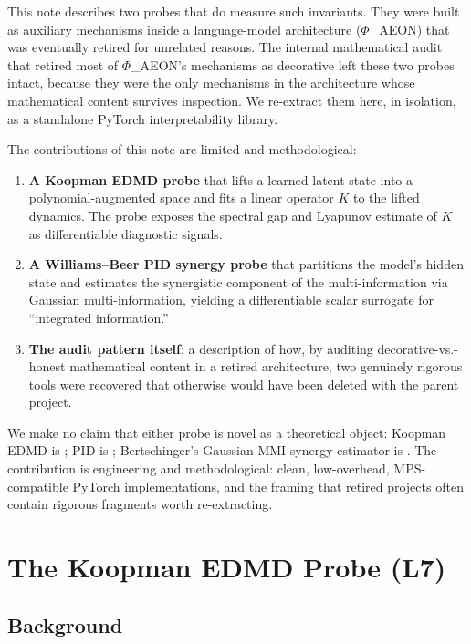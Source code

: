 \documentclass[11pt]{article}
\begin{document}
This note describes two probes that do measure such invariants. They were
built as auxiliary mechanisms inside a language-model architecture
($\Phi$\_AEON) that was eventually retired for unrelated reasons. The
internal mathematical audit that retired most of $\Phi$\_AEON's mechanisms
as decorative left these two probes intact, because they were the only
mechanisms in the architecture whose mathematical content survives
inspection. We re-extract them here, in isolation, as a standalone
PyTorch interpretability library.

The contributions of this note are limited and methodological:

\begin{enumerate}
\item \textbf{A Koopman EDMD probe} that lifts a learned latent state
into a polynomial-augmented space and fits a linear operator $K$ to the
lifted dynamics. The probe exposes the spectral gap and Lyapunov estimate
of $K$ as differentiable diagnostic signals.
\item \textbf{A Williams--Beer PID synergy probe} that partitions the
model's hidden state and estimates the synergistic component of the
multi-information via Gaussian multi-information, yielding a
differentiable scalar surrogate for ``integrated information.''
\item \textbf{The audit pattern itself}: a description of how, by
auditing decorative-vs.-honest mathematical content in a retired
architecture, two genuinely rigorous tools were recovered that otherwise
would have been deleted with the parent project.
\end{enumerate}

We make no claim that either probe is novel as a theoretical object:
Koopman EDMD is \citet{williams2015data}; PID is \citet{williams2010nonnegative};
Bertschinger's Gaussian MMI synergy estimator is
\citet{bertschinger2014quantifying}. The contribution is engineering and
methodological: clean, low-overhead, MPS-compatible PyTorch
implementations, and the framing that retired projects often contain
rigorous fragments worth re-extracting.

\section{The Koopman EDMD Probe (L7)}
\label{sec:koopman}

\subsection{Background}
\end{document}
